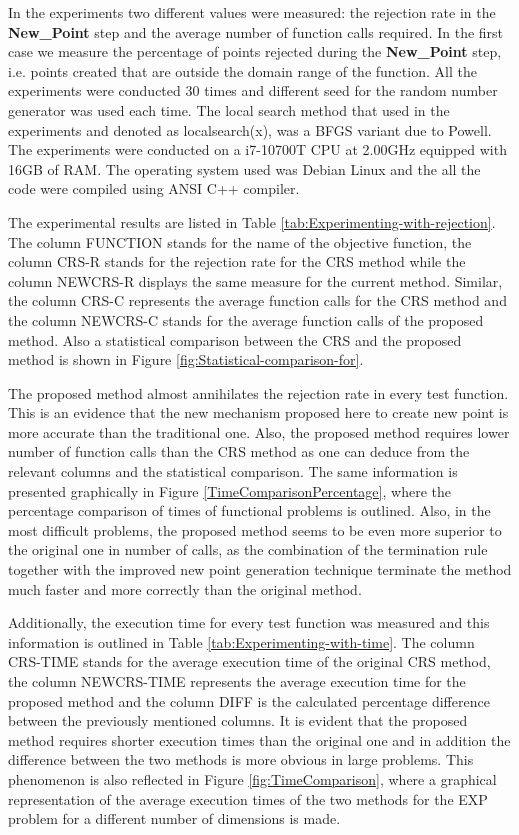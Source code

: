 \documentclass[symmetry,article,submit,moreauthors,pdftex]{mdpi}
\begin{document}
In the experiments two different values were measured: the rejection
rate in the\textbf{ New\_Point} step and the average number of function
calls required. In the first case we measure the percentage of points
rejected during the\textbf{ New\_Point} step, i.e. points created
that are outside the domain range of the function. All the experiments
were conducted 30 times and different seed for the random number generator
was used each time. The local search method that used in the experiments
and denoted as localsearch(x), was a BFGS variant due to Powell\cite{powell}. The experiments were conducted on a  i7-10700T CPU at 2.00GHz equipped with 16GB of RAM. The operating system used was Debian Linux and the all the code were compiled using ANSI C++ compiler.

The experimental results are listed in Table \ref{tab:Experimenting-with-rejection}.
The column FUNCTION stands for the name of the objective function,
the column CRS-R stands for the rejection rate\textbf{ }for the CRS
method while the column NEWCRS-R displays  the same measure for the
current method. Similar, the column CRS-C represents the average
function calls for the CRS method and the column NEWCRS-C stands for
the average function calls of the proposed method. Also a statistical
comparison between the CRS and the proposed method is shown in Figure
\ref{fig:Statistical-comparison-for}.

The proposed method almost annihilates the rejection rate in every
test function. This is an evidence that the new mechanism proposed
here to create new point is more accurate than the traditional one.
Also, the proposed method requires lower number of function calls
than the CRS method as one can deduce from the relevant columns and
the statistical comparison. The same information is presented graphically in Figure \ref{TimeComparisonPercentage}, where the percentage comparison of times of functional problems
is outlined. Also, in the most difficult problems, the proposed method seems to be even more superior to the original one in  number of calls, as the combination of the termination rule together with the improved new point generation technique terminate the method much faster and more correctly than the original method. 

Additionally, the execution time for every test function was measured and this information  is outlined in Table \ref{tab:Experimenting-with-time}. The column CRS-TIME stands for the average execution time of the original CRS method, the column NEWCRS-TIME represents the average execution time for the proposed method and the column DIFF is the calculated percentage difference between the previously mentioned columns.  It is evident that the proposed method requires shorter execution times than the original one and in addition the difference between the two methods is more obvious in large problems. This phenomenon is also reflected in Figure \ref{fig:TimeComparison}, where a graphical representation of the average execution times of the two methods for the EXP problem for a different number of dimensions is made. 
\end{document}
